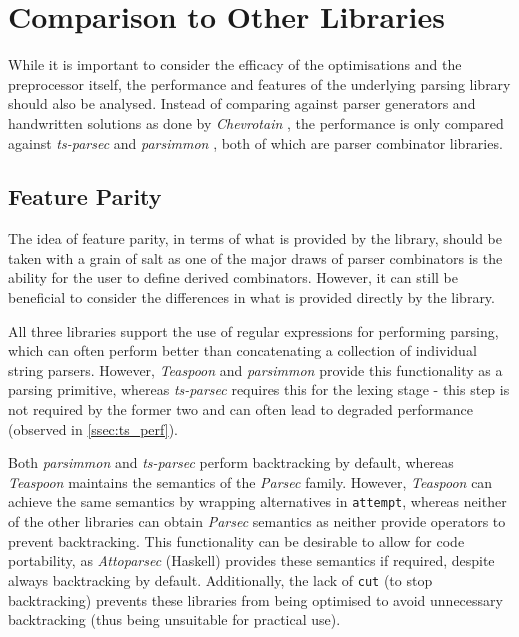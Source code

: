 \section{Comparison to Other Libraries}
\label{sec:ts_compare}

While it is important to consider the efficacy of the optimisations and the preprocessor itself, the performance and features of the underlying parsing library should also be analysed.
Instead of comparing against parser generators and handwritten solutions as done by \textit{Chevrotain} \cite{chev}, the performance is only compared against \textit{ts-parsec} \cite{tsparsec} and \textit{parsimmon} \cite{parsimmon}, both of which are parser combinator libraries.

\subsection{Feature Parity}
The idea of feature parity, in terms of what is provided by the library, should be taken with a grain of salt as one of the major draws of parser combinators is the ability for the user to define derived combinators.
However, it can still be beneficial to consider the differences in what is provided directly by the library.

All three libraries support the use of regular expressions for performing parsing, which can often perform better than concatenating a collection of individual string parsers.
However, \textit{Teaspoon} and \textit{parsimmon} provide this functionality as a parsing primitive, whereas \textit{ts-parsec} requires this for the lexing stage - this step is not required by the former two and can often lead to degraded performance (observed in \autoref{ssec:ts_perf}).

Both \textit{parsimmon} and \textit{ts-parsec} perform backtracking by default, whereas \textit{Teaspoon} maintains the semantics of the \textit{Parsec} family.
However, \textit{Teaspoon} can achieve the same semantics by wrapping alternatives in \texttt{attempt}, whereas neither of the other libraries can obtain \textit{Parsec} semantics as neither provide operators to prevent backtracking.
This functionality can be desirable to allow for code portability, as \textit{Attoparsec} (Haskell) provides these semantics if required, despite always backtracking by default.
Additionally, the lack of \texttt{cut} (to stop backtracking) prevents these libraries from being optimised to avoid unnecessary backtracking (thus being unsuitable for practical use).

